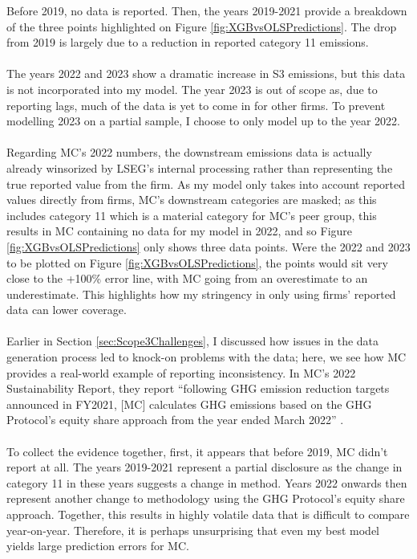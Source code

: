 \documentclass[12pt,twoside]{report}
\begin{document}
Before 2019, no data is reported. Then, the years 2019-2021 provide a breakdown of the three points highlighted on Figure \ref{fig:XGBvsOLSPredictions}. The drop from 2019 is largely due to a reduction in reported category 11 emissions. 
\\\\
The years 2022 and 2023 show a dramatic increase in S3 emissions, but this data is not incorporated into my model. The year 2023 is out of scope as, due to reporting lags, much of the data is yet to come in for other firms. To prevent modelling 2023 on a partial sample, I choose to only model up to the year 2022.
\\\\
Regarding MC's 2022 numbers, the downstream emissions data is actually already winsorized by LSEG's internal processing rather than representing the true reported value from the firm. As my model only takes into account reported values directly from firms, MC's downstream categories are masked; as this includes category 11 which is a material category for MC's peer group, this results in MC containing no data for my model in 2022, and so Figure \ref{fig:XGBvsOLSPredictions} only shows three data points. Were the 2022 and 2023 to be plotted on Figure \ref{fig:XGBvsOLSPredictions}, the points would sit very close to the +100\% error line, with MC going from an overestimate to an underestimate. This highlights how my stringency in only using firms' reported data can lower coverage. 
\\\\
Earlier in Section \ref{sec:Scope3Challenges}, I discussed how issues in the data generation process led to knock-on problems with the data; here, we see how MC provides a real-world example of reporting inconsistency. In MC's 2022 Sustainability Report, they report ``following GHG emission reduction targets announced in FY2021, [MC] calculates GHG emissions based on the GHG Protocol's equity share approach from the year ended March 2022'' \cite{MC2022}. 
\\\\
To collect the evidence together, first, it appears that before 2019, MC didn't report at all. The years 2019-2021 represent a partial disclosure as the change in category 11 in these years suggests a change in method. Years 2022 onwards then represent another change to methodology using the GHG Protocol's equity share approach. Together, this results in highly volatile data that is difficult to compare year-on-year. Therefore, it is perhaps unsurprising that even my best model yields large prediction errors for MC.  
\end{document}
